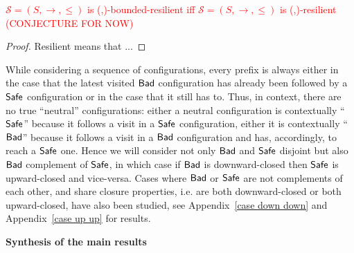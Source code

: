 \begin{proposition}\label{general}
\textcolor{red}{
$\mathscr{S}=(S,\rightarrow,\leq)$ is %
(\Bad,\Safe)-bounded-resilient iff $\mathscr{S}=(S,\rightarrow,\leq)$ is %
(\Bad,\Safe)-resilient (CONJECTURE FOR NOW)
}
\end{proposition}

\begin{proof}
Resilient means that ...
\end{proof}

\fi






While considering a sequence of configurations, every prefix is always 
either in the case that the latest visited $\textsf{Bad}$ configuration has already been followed by a $\textsf{Safe}$ configuration
or in the case that it still has to. 
Thus, in context, there are no true ``neutral'' configurations: either a neutral configuration is contextually ``$\textsf{Safe}$'' because it follows a visit in a $\textsf{Safe}$ configuration, either it is contextually ``$\textsf{Bad}$'' because it follows a visit in a $\textsf{Bad}$ configuration and has, accordingly, to reach a $\textsf{Safe}$ one.
Hence we will consider not only $\textsf{Bad}$ and $\textsf{Safe}$ disjoint but
	also
$\textsf{Bad}$ complement of $\textsf{Safe}$,
in which case
if $\textsf{Bad}$ is downward-closed then $\textsf{Safe}$ is upward-closed and vice-versa.
Cases where $\textsf{Bad}$ or $\textsf{Safe}$ are not complements of each other, and share closure properties, i.e. are both downward-closed or both upward-closed,
have also been studied, 
see 
Appendix~\ref{case down down}
and
Appendix~\ref{case up up} for results.








{\bf Synthesis of the main results}\label{synthesis}



